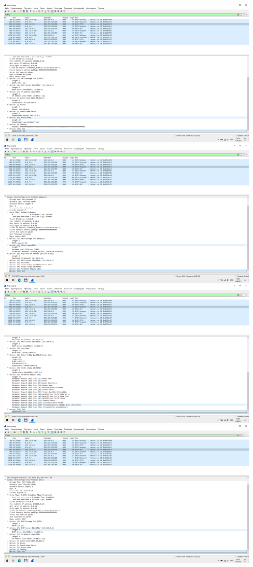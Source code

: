 \includegraphics{screenshots/dhcp_offer_2}
\includegraphics{screenshots/dhcp_request1_1}
\includegraphics{screenshots/dhcp_request1_2}
\includegraphics{screenshots/dhcp_ack1_1}
